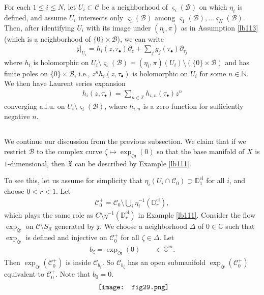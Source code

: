 \documentclass[12pt,a4paper,notitlepage]{article}
\theoremstyle{definition}
\theoremstyle{plain}
\newcommand{\fk}{\mathfrak}
\newcommand{\mc}{\mathcal}
\newcommand{\xk}{\mathfrak x}
\newcommand{\yk}{\mathfrak y}
\newcommand{\sgm}{\varsigma}
\newcommand{\SX}{{S_{\fk X}}}
\newcommand{\blt}{\bullet}
\newcommand{\Cbb}{\mathbb C}
\newcommand{\Nbb}{\mathbb N}
\newcommand{\Zbb}{\mathbb Z}
\newcommand{\Dbb}{\mathbb D}
\newcommand{\cl}{\mathrm{cl}}
\numberwithin{equation}{section}
\begin{document}
For each $1\leq i\leq N$, let $U_i\subset\mc C$ be a neighborhood of $\sgm_i(\mc B)$ on which $\eta_i$ is defined, and assume $U_i$ intersects only $\sgm_i(\mc B)$ among $\sgm_1(\mc B),\dots\sgm_N(\mc B)$. Then, after identifying $U_i$ with its image under $(\eta_i,\pi)$ as in Assumption \ref{lb113} (which is a neighborhood of $\{0\}\times\mc B$), we can write
\begin{align}
\xk|_{U_i}=h_i(z,\tau_\blt)\partial_z+\sum_j g_j(\tau_\blt)\partial_{\tau_j}\label{eq213}
\end{align}
where $h_i$ is holomorphic on $U_i\setminus\sgm_i(\mc B)=(\eta_i,\pi)(U_i)\setminus(\{0\}\times\mc B)$ and has finite poles on  $\{0\}\times\mc B$, i.e., $z^nh_i(z,\tau_\blt)$ is holomorphic on $U_i$ for some $n\in\Nbb$. We then have Laurent series expansion
\begin{align}
h_i(z,\tau_\blt)=\sum_{n\in\Zbb}h_{i,n}(\tau_\blt)z^n\label{eq214}
\end{align}
converging a.l.u. on $U_i\setminus\sgm_i(\mc B)$, where $h_{i,n}$ is a zero function for sufficiently negative $n$.


\subsection{}

We continue our discussion from the previous subsection. We claim that if we restrict $\mc B$ to the complex curve $\zeta\mapsto \exp_{\zeta\yk}(0)$ so that the base manifold of $X$ is $1$-dimensional, then $\fk X$ can be described by Example \ref{lb111}. 

To see this, let us assume for simplicity that $\eta_i(U_i\cap\mc C_0)\supset \Dbb_1^\cl$ for all $i$, and choose $0<r<1$. Let
\begin{align*}
\mc C_0^+=\mc C_0\setminus\bigcup_i \eta_i^{-1}(\Dbb_r^\cl),
\end{align*}
which plays the same role as $C\setminus\eta^{-1}(\Dbb_r^\cl)$ in Example \ref{lb111}. Consider the flow $\exp_{\zeta\xk}$ on $\mc C\setminus\SX$ generated by $\xk$. We choose a neighborhood $\Delta$ of $0\in\Cbb$ such that  $\exp_{\zeta\xk}$ is defined and injective on $\mc C_0^+$ for all $\zeta\in\Delta$. Let 
\begin{align*}
b_\zeta=\exp_{\zeta\yk}(0)\qquad\in\Cbb^m.
\end{align*}
Then $\exp_{\zeta\xk}(\mc C_0^+)$ is inside $\mc C_{b_\zeta}$. So $\mc C_{b_\zeta}$ has an open submanifold $\exp_{\zeta\xk}(\mc C_0^+)$ equivalent to $\mc C_0^+$. Note that $b_0=0$.
\begin{align}\label{eq237}
\vcenter{\hbox{{
\texttt{[image: fig29.png]}}}}
\end{align}
\end{document}
